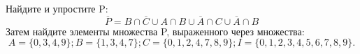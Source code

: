 \question
Найдите и упростите P:
\begin{equation*}
\overline{P} = B \cap \overline{C} \cup A \cap B \cup \overline{A} \cap C \cup \overline{A} \cap B
\end{equation*}
Затем найдите элементы множества P, выраженного через множества:
\begin{equation*}
A = \{0, 3, 4, 9\}; 
B = \{1, 3, 4, 7\};
C = \{0, 1, 2, 4, 7, 8, 9\};
I = \{0, 1, 2, 3, 4, 5, 6, 7, 8, 9\}.
\end{equation*}